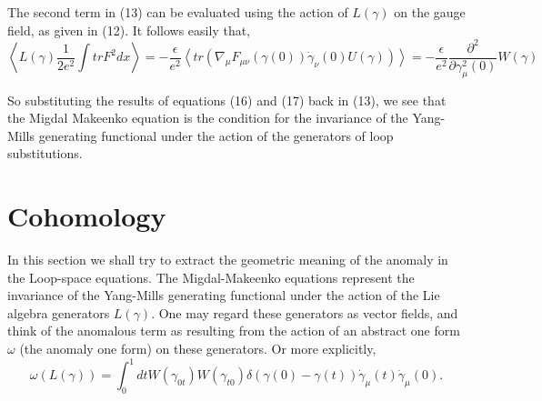 \documentclass[a4paper,12]{article}
\begin{document}
The second term in (13) can be evaluated using the action of 
$L(\gamma )$ on  the gauge field, as given in (12). It follows easily 
that,
\begin{equation}
\left<L(\gamma )\frac{1}{2e^2}\int tr F^2 dx \right> = -\frac{\epsilon 
}{e^2}\left<tr(\nabla _\mu F_{\mu \nu }(\gamma (0))\dot{\gamma }_\nu 
(0)U(\gamma ))\right> = -\frac{\epsilon }{e^2} \frac{\partial ^2}{\partial 
\gamma ^2 _\mu (0)}W(\gamma )
\end{equation}

So substituting the results of equations (16) and (17) back in (13), we 
see that 
the Migdal Makeenko 
equation is the condition for the invariance of the Yang-Mills generating 
functional under the action of the generators of loop substitutions. 


\section{Cohomology}

In this section we shall try to extract the geometric meaning of the 
anomaly in the Loop-space equations. The Migdal-Makeenko equations 
represent the invariance of the Yang-Mills generating functional under the 
action of the Lie algebra generators $L(\gamma )$. One may regard these 
generators as vector fields, and think of the anomalous term as resulting 
from the action of an abstract one form $\omega $ (the anomaly one form)  
 on these generators. Or 
more explicitly,
\begin{equation}
\omega (L(\gamma )) = \int _0 ^1dt W(\gamma _{0t})W(\gamma _{t0})\delta 
(\gamma (0) - \gamma (t))\dot{\gamma }_\mu (t) \dot{\gamma }_{\mu }(0). 
\end{equation}
\end{document}
